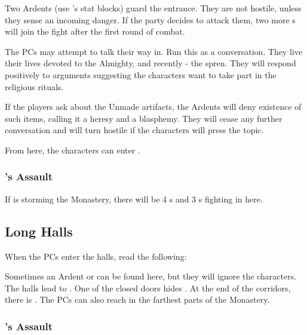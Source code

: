 Two Ardents (use \enemyCultist{}'s stat blocks) guard the entrance. They are not hostile, unless they sense an incoming danger. If the party decides to attack them, two more \enemyCultist{}s will join the fight after the first round of combat.

The PCs may attempt to talk their way in. Run this as a conversation.
They live their lives devoted to the Almighty, and recently - the spren. They will respond positively to arguments suggesting the characters want to take part in the religious rituals.


If the players ask about the Unmade artifacts, the Ardents will deny existence of such items, calling it a heresy and a blasphemy. They will cease any further conversation and will turn hostile if the characters will press the topic.

From here, the characters can enter .

\subsubsection{\npcHighmarshalName{}'s Assault}

If \npcHighmarshal{} is storming the Monastery, there will be 4 \enemyCultist{}s and 3 \enemyWallGuard{}s fighting in here.




\subsection{Long Halls}
\label{ssec:monasteryHalls}

When the PCs enter the halls, read the following:


Sometimes an Ardent or \enemyCultistOfMoments{} can be found here, but they will ignore the characters. The halls lead to . One of the closed doors hides . At the end of the corridors, there is . The PCs can also reach  in the farthest parts of the Monastery.

\subsubsection{\npcHighmarshalName{}'s Assault}

